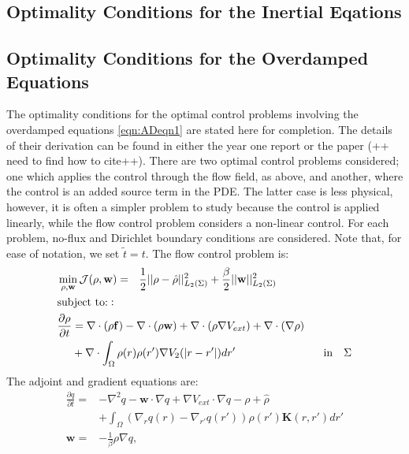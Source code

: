\documentclass[11pt, a4paper]{article}
\theoremstyle{definition}
\newcommand{\Sta}{\rho}
\newcommand{\Adjb}{q}
\newcommand{\Con}{\mathbf{f}}
\begin{document}
\subsection{Optimality Conditions for the Inertial Eqations}




\subsection{Optimality Conditions for the Overdamped Equations}
The optimality conditions for the optimal control problems involving the overdamped equations \eqref{eqn:ADeqn1} are stated here for completion. The details of their derivation can be found in either the year one report or the paper (++ need to find how to cite++).
There are two optimal control problems considered; one which applies the control through the flow field, as above, and another, where the control is an added source term in the PDE. The latter case is less physical, however, it is often a simpler problem to study because the control is applied linearly, while the flow control problem considers a non-linear control. For each problem, no-flux and Dirichlet boundary conditions are considered. Note that, for ease of notation, we set $\tilde t = t$.
The flow control problem is:
\begin{align}
\label{eqn:ADFlowOCP}
&\min_{\Sta,\mathbf{w} } \mathcal J(\Sta,\mathbf{w} ) =\ \ \frac{1}{2}||\Sta - \hat \Sta||_{L_2(\Sigma)}^2  +\frac{\beta}{2}||\mathbf{w}||_{L_2(\Sigma)}^2\\
& \text{subject to:}: \notag\\
&\frac{\partial \Sta}{\partial t} = \nabla \cdot (\Sta\Con) - \nabla \cdot (\Sta \mathbf{w})  + \nabla \cdot (\rho\nabla V_{ext}) + \nabla \cdot (\nabla \rho)\notag \\
& \quad \ +\nabla \cdot \int_\Omega \Sta(r)\Sta(r') \nabla V_2(|r-r'|)dr' \qquad \qquad \qquad \qquad \text{in} \quad \Sigma\notag
\end{align}
The adjoint and gradient equations are:
\begin{align*}
\frac{\partial \Adjb}{\partial t} =& - \nabla^2\Adjb - \mathbf{w} \cdot \nabla \Adjb + \nabla V_{ext} \cdot \nabla \Adjb - \Sta + \hat \rho \\
&+\int_\Omega (\nabla_r \Adjb(r) - \nabla_{r'} \Adjb(r') ) \rho(r') \mathbf{K}(r,r') dr'\\
\mathbf{w} =& - \frac{1}{\beta} \Sta \nabla \Adjb,
\end{align*}
\end{document}
